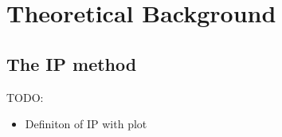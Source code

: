 
\chapter{Theoretical Background} %

\label{Chapter3} %

\section{The IP method}
TODO:
\begin{itemize}
	\item Definiton of IP with plot
\end{itemize}
\label{sec:IP_method}

